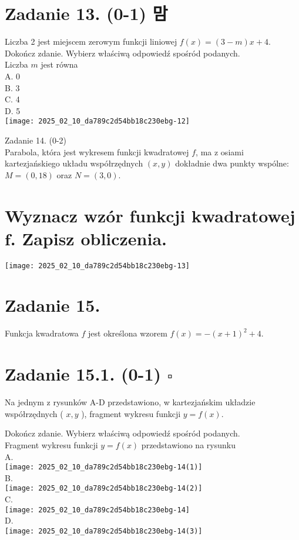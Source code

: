 \documentclass[10pt]{article}
\begin{document}
\section*{Zadanie 13. (0-1) 맘}
Liczba 2 jest miejscem zerowym funkcji liniowej \(f(x)=(3-m) x+4\).\\
Dokończ zdanie. Wybierz właściwą odpowiedź spośród podanych.\\
Liczba \(m\) jest równa\\
A. 0\\
B. 3\\
C. 4\\
D. 5\\
\texttt{[image: 2025\_02\_10\_da789c2d54bb18c230ebg-12]}

Zadanie 14. (0-2)\\
Parabola, która jest wykresem funkcji kwadratowej \(f\), ma z osiami kartezjańskiego układu współrzędnych \((x, y)\) dokładnie dwa punkty wspólne: \(M=(0,18)\) oraz \(N=(3,0)\).

\section*{Wyznacz wzór funkcji kwadratowej \(\boldsymbol{f}\). Zapisz obliczenia.}
\begin{center}
\texttt{[image: 2025\_02\_10\_da789c2d54bb18c230ebg-13]}
\end{center}

\section*{Zadanie 15.}
Funkcja kwadratowa \(f\) jest określona wzorem \(f(x)=-(x+1)^{2}+4\).

\section*{Zadanie 15.1. (0-1) \(\square\)}
Na jednym z rysunków A-D przedstawiono, w kartezjańskim układzie współrzędnych ( \(x, y\) ), fragment wykresu funkcji \(y=f(x)\).

Dokończ zdanie. Wybierz właściwą odpowiedź spośród podanych.\\
Fragment wykresu funkcji \(y=f(x)\) przedstawiono na rysunku\\
A.\\
\texttt{[image: 2025\_02\_10\_da789c2d54bb18c230ebg-14(1)]}\\
B.\\
\texttt{[image: 2025\_02\_10\_da789c2d54bb18c230ebg-14(2)]}\\
C.\\
\texttt{[image: 2025\_02\_10\_da789c2d54bb18c230ebg-14]}\\
D.\\
\texttt{[image: 2025\_02\_10\_da789c2d54bb18c230ebg-14(3)]}
\end{document}
